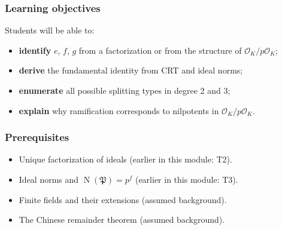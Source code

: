 \documentclass[11pt]{article}
\newcommand{\OK}{\mathcal{O}_K}
\newcommand{\fP}{\mathfrak{P}}
\DeclareMathOperator{\Nm}{N}
\begin{document}
\subsubsection*{Learning objectives}
Students will be able to:
\begin{itemize}
  \item \textbf{identify} $e$, $f$, $g$ from a factorization or from the structure of $\OK/p\OK$;
  \item \textbf{derive} the fundamental identity from CRT and ideal norms;
  \item \textbf{enumerate} all possible splitting types in degree 2 and 3;
  \item \textbf{explain} why ramification corresponds to nilpotents in $\OK/p\OK$.
\end{itemize}

\subsubsection*{Prerequisites}
\begin{itemize}
  \item Unique factorization of ideals (earlier in this module: T2).
  \item Ideal norms and $\Nm(\fP)=p^f$ (earlier in this module: T3).
  \item Finite fields and their extensions (assumed background).
  \item The Chinese remainder theorem (assumed background).
\end{itemize}
\end{document}
